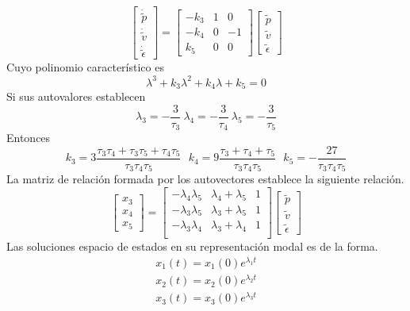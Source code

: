 \documentclass[10pt]{report}
\numberwithin{equation}{chapter}
\numberwithin{algorithm}{chapter}
\begin{document}
\begin{equation}\label{obs_ecc8}
\begin{bmatrix}\dot{\tilde{p}}\\\dot{\tilde{v}}\\\dot{\tilde{\epsilon}}\end{bmatrix}=
\begin{bmatrix}-k_3&1&0\\-k_4&0&-1\\k_5&0&0
\end{bmatrix}\begin{bmatrix}\tilde{p}\\\tilde{v}\\\tilde{\epsilon}\end{bmatrix}
\end{equation}
Cuyo polinomio característico es $$\lambda^3+k_3\lambda^2+k_4\lambda +k_5=0$$ Si sus autovalores establecen $$\lambda_3=-\frac{3}{\tau_3}~\lambda_4=-\frac{3}{\tau_4}~\lambda_5=-\frac{3}{\tau_5}$$ Entonces 
\begin{equation}\label{obs_ecc12}
k_3=3\frac{\tau_3\tau_4+\tau_3\tau_5+\tau_4\tau_5}{\tau_3\tau_4\tau_5}~~~k_4=9\frac{\tau_3+\tau_4+\tau_5}{\tau_3\tau_4\tau_5}~~~k_5=-\frac{27}{\tau_3\tau_4\tau_5}
\end{equation}
La matriz de relación formada por los autovectores establece la siguiente relación.\begin{equation}\label{obs_ecc6}
\begin{bmatrix}x_3\\x_4\\x_5\end{bmatrix}=
\begin{bmatrix}-\lambda_4\lambda_5&\lambda_4+\lambda_5&1\\
-\lambda_3\lambda_5&\lambda_3+\lambda_5&1\\
-\lambda_3\lambda_4&\lambda_3+\lambda_4&1\\
\end{bmatrix}\begin{bmatrix}\tilde{p}\\\tilde{v}\\\tilde{\epsilon}\end{bmatrix}
\end{equation}
Las soluciones espacio de estados en su representación modal es de la forma.
\begin{equation}\label{obs_ecc7}
\begin{array}{c}
x_1(t)=x_1(0)e^{\lambda_1t}\\
x_2(t)=x_2(0)e^{\lambda_2t}\\
x_3(t)=x_3(0)e^{\lambda_3t}
\end{array}
\end{equation}
\end{document}
